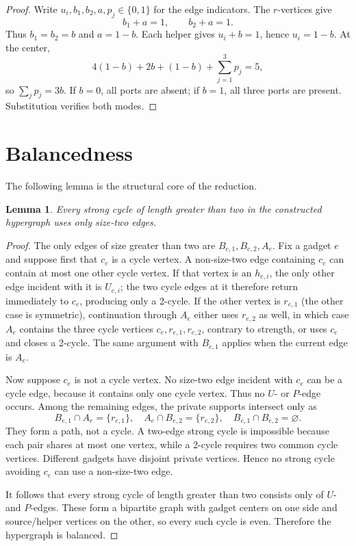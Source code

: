 \documentclass[11pt]{article}
\newtheorem{lemma}[theorem]{Lemma}
\theoremstyle{definition}
\theoremstyle{remark}
\begin{document}
\begin{proof}
Write $u_i,b_1,b_2,a,p_j\in\{0,1\}$ for the edge indicators. The
$r$-vertices give
\[
b_1+a=1,\qquad b_2+a=1.
\]
Thus $b_1=b_2=b$ and $a=1-b$. Each helper gives $u_i+b=1$, hence
$u_i=1-b$. At the center,
\[
4(1-b)+2b+(1-b)+\sum_{j=1}^3p_j=5,
\]
so $\sum_jp_j=3b$. If $b=0$, all ports are absent; if $b=1$, all three
ports are present. Substitution verifies both modes.
\end{proof}

\section{Balancedness}

The following lemma is the structural core of the reduction.

\begin{lemma}
Every strong cycle of length greater than two in the constructed hypergraph
uses only size-two edges.
\end{lemma}

\begin{proof}
The only edges of size greater than two are $B_{e,1},B_{e,2},A_e$. Fix a
gadget $e$ and suppose first that $c_e$ is a cycle vertex. A non-size-two
edge containing $c_e$ can contain at most one other cycle vertex. If that
vertex is an $h_{e,i}$, the only other edge incident with it is $U_{e,i}$;
the two cycle edges at it therefore return immediately to $c_e$, producing
only a 2-cycle. If the other vertex is $r_{e,1}$ (the other case is
symmetric), continuation through $A_e$ either uses $r_{e,2}$ as well, in
which case $A_e$ contains the three cycle vertices $c_e,r_{e,1},r_{e,2}$,
contrary to strength, or uses $c_e$ and closes a 2-cycle. The same argument
with $B_{e,1}$ applies when the current edge is $A_e$.

Now suppose $c_e$ is not a cycle vertex. No size-two edge incident with
$c_e$ can be a cycle edge, because it contains only one cycle vertex. Thus
no $U$- or $P$-edge occurs. Among the remaining edges, the private supports
intersect only as
\[
B_{e,1}\cap A_e=\{r_{e,1}\},\quad
A_e\cap B_{e,2}=\{r_{e,2}\},\quad
B_{e,1}\cap B_{e,2}=\varnothing.
\]
They form a path, not a cycle. A two-edge strong cycle is impossible because
each pair shares at most one vertex, while a 2-cycle requires two common
cycle vertices. Different gadgets have disjoint private vertices. Hence no
strong cycle avoiding $c_e$ can use a non-size-two edge.

It follows that every strong cycle of length greater than two consists only
of $U$- and $P$-edges. These form a bipartite graph with gadget centers on
one side and source/helper vertices on the other, so every such cycle is
even. Therefore the hypergraph is balanced.
\end{proof}
\end{document}
